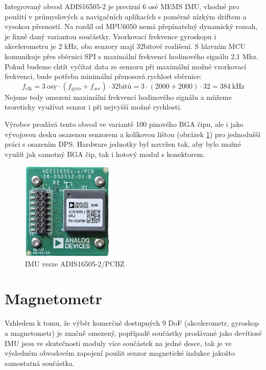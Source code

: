 Integrovaný obvod ADIS16505-2 je precizní 6 osé \ac{MEMS} \ac{IMU}, vhodné pro použití v průmyslových a navigačních aplikacích s poměrně nízkým driftem a vysokou přesností. Na rozdíl od MPU6050 nemá přepínatelný dynamický rozsah, je fixně daný variantou součástky. Vzorkovací frekvence gyroskopu i akcelerometru je 2 kHz, oba senzory mají 32bitové rozlišení. S hlavním \ac{MCU} komunikuje přes sběrnici \ac{SPI} s maximální frekvencí hodinového signálu 2,1 Mhz. \cite{UZFqHmQU7ZzI3OLB} Pokud budeme chtít vyčítat data ze senzoru při maximální možné vzorkovací frekvenci, bude potřeba minimální přenosová rychlost sběrnice: 
\begin{equation}
f_{\mathrm{clk}}=3~\mathrm{osy} \cdot(f_{\mathrm{gyro}} + f_{\mathrm{acc}})\cdot \mathrm{32bitů}=3\cdot(2000+2000)\cdot 32=\SI{384}{\kilo\hertz}
\end{equation}
Nejsme tedy omezeni maximální frekvencí hodinového signálu a můžeme teoreticky využívat senzor i při nejvyšší možné rychlosti.

Výrobce prodává tento obvod ve variantě 100 pinového \ac{BGA} čipu, ale i jako vývojovou desku osazenou senzorem a kolíkovou lištou (obrázek \ref{fig:ADIS16505PCB}) pro jednodušší práci s osazením \ac{DPS}. \cite{UZFqHmQU7ZzI3OLB} Hardware jednotky byl navržen tak, aby bylo možné využít jak samotný \ac{BGA} čip, tak i hotový modul s konektorem.

\begin{figure}[h]
    \centering
    \includegraphics[width=0.4\textwidth]{obrazky/ADIS16505PCB}
    \caption{IMU verze ADIS16505-2/PCBZ}
    \label{fig:ADIS16505PCB}
\end{figure}

\section{Magnetometr}
Vzhledem k tomu, že výběr komerčně dostupných 9 \ac{DoF} (akcelerometr, gyroskop a magnetometr) je značně omezený, popřípadě součástky prodávané jako devítiosé IMU jsou ve skutečnosti moduly více součástek na jedné desce, tak je ve výsledném obvodovém zapojení použit senzor magnetické indukce jakožto samostatná součástka. 

